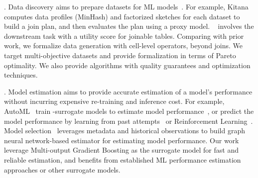 . 
Data discovery 
aims to prepare datasets for ML models~\cite{laure2018machine,roh2019survey,esmailoghli2023blend,huang2023kitana,galhotra2023metam}. 
For example, Kitana~\cite{huang2023kitana} computes data profiles (\eg MinHash) and factorized sketches for each dataset to build a join plan, and then evaluates the plan using a proxy model. 
\metam~\cite{galhotra2023metam} involves the downstream task with a utility score for joinable tables.  
Comparing with prior work,  we formalize data generation with cell-level operators, beyond joins. 
We target multi-objective datasets and provide 
formalization in terms of Pareto optimality. 
We also provide algorithms with quality guarantees and 
optimization techniques. 


. Model 
estimation aims to 
provide accurate estimation of 
a model's performance without 
incurring expensive re-training 
and inference cost. 
For example, AutoML~\cite{ hwang2018fast, nguyen2020avatar, yang2020automl} train %
-surrogate models to estimate model performance~\cite{ hwang2018fast, nguyen2020avatar, yang2020automl}, or predict the model performance by learning from past attempts~\cite{feurer2018practical} or Reinforcement Learning~\cite{drori2019automatic}. 
Model selection~\cite{wang2023selecting} 
leverages metadata and historical observations to build graph neural network-based estimator for estimating model performance. 
Our work leverage Multi-output Gradient Boosting as the surrogate model for fast and 
reliable estimation, and benefits 
from established ML performance  
estimation approaches or other surrogate models. 


